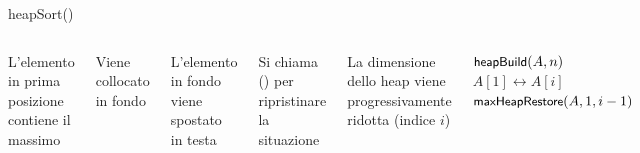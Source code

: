\begin{frame}{heapSort()}

\vspace{-6pt}
\begin{columns}[T]
\vspace{-6pt}
\small
\BIL
\item L'elemento in prima posizione contiene il massimo
\item Viene collocato in fondo
\item L'elemento in fondo viene spostato in testa
\item Si chiama \maxheapify() per ripristinare la situazione
\item La dimensione dello heap viene progressivamente ridotta 
(indice $i$)
\EIL
{}
\vspace{-9pt}
\begin{Procedure}
\caption[A]{\textsc{heapSort}($\Item[\,]\ A$, \INTEGER $n$)}
$\textsf{{\small heapBuild}}(A, n)$\;
{
  $A[1] \leftrightarrow A[i]$\;
  $\textsf{{\small maxHeapRestore}}(A, 1, i-1)$\;
}
\end{Procedure}
\end{columns}
\end{frame}

